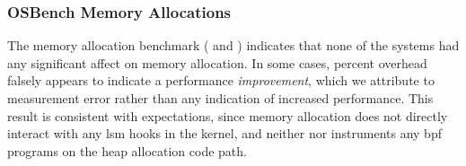 \subsubsection{OSBench Memory Allocations}

The memory allocation benchmark ( and
) indicates that none of the systems had any significant affect on
memory allocation. In some cases, percent overhead falsely appears to indicate
a performance \textit{improvement}, which we attribute to measurement error rather than
any indication of increased performance. This result is consistent with expectations,
since memory allocation does not directly interact with any \gls{lsm} hooks in the kernel,
and neither \bpfbox{} nor \bpfcontain{} instruments any \gls{bpf} programs on the heap
allocation code path.





